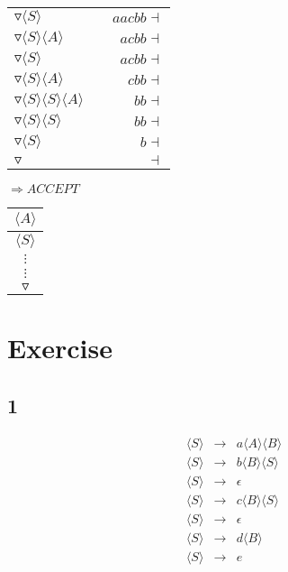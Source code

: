 \documentclass[a4paper,12pt]{article}
\newcommand{\nonterminal}[1]{\langle #1 \rangle}
\begin{document}
\begin{tabular}{lcr}
$\triangledown \nonterminal{S}$	&	\hspace{10mm}	&	$aacbb\dashv$	\\
$\triangledown \nonterminal{S} \nonterminal{A}$	&	\hspace{10mm}	&	$acbb\dashv$	\\
$\triangledown \nonterminal{S}$	&	\hspace{10mm}	&	$acbb\dashv$	\\
$\triangledown \nonterminal{S} \nonterminal{A}$	&	\hspace{10mm}	&	$cbb\dashv$	\\
$\triangledown \nonterminal{S} \nonterminal{S}\nonterminal{A}$	&	\hspace{10mm}	&	$bb\dashv$	\\
$\triangledown \nonterminal{S} \nonterminal{S}$	&	\hspace{10mm}	&	$bb\dashv$	\\
$\triangledown \nonterminal{S}$	&	\hspace{10mm}	&	$b\dashv$	\\
$\triangledown $						&	\hspace{10mm}	&	$\dashv$	\\
\end{tabular}

$\Rightarrow ACCEPT$

\begin{tabular}{|c|}
		\\
\hline
\sout{$\nonterminal{A}$}	\\
\hline
$\nonterminal{S}$	\\
\hline
$\vdots$	\\
$\vdots$	\\
\hline
$\triangledown$	\\
\hline
\end{tabular}

\section*{Exercise}

\subsection*{1}

\begin{eqnarray}
\nonterminal{S}	&	\to	&	a \nonterminal{A} \nonterminal{B}	\\	
\nonterminal{S}	&	\to	&	b \nonterminal{B} \nonterminal{S}	\\	
\nonterminal{S}	&	\to	&	\epsilon										\\	
\nonterminal{S}	&	\to	&	c \nonterminal{B} \nonterminal{S}	\\	
\nonterminal{S}	&	\to	&	\epsilon										\\
\nonterminal{S}	&	\to	&	d \nonterminal{B}							\\	
\nonterminal{S}	&	\to	&	e 												\\	
\end{eqnarray}
\end{document}
